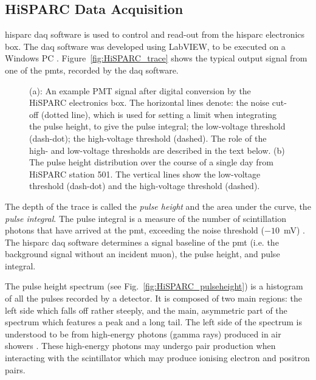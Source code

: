 \subsection{HiSPARC Data Acquisition}\label{sec:intro_HS_DAQ}

\gls{hisparc} \gls{daq} software is used to control and read-out from the \gls{hisparc} electronics box. The \gls{daq} software was developed using LabVIEW, to be executed on a Windows PC \citep{van_dam_hisparc_2020}. Figure~\ref{fig:HiSPARC_trace} shows the typical output signal from one of the \glspl{pmt}, recorded by the \gls{daq} software. 

\begin{figure}[ht!]
	\centering
	
	\caption{(a): An example PMT signal after digital conversion by the HiSPARC electronics box. The horizontal lines denote: the noise cut-off (dotted line), which is used for setting a limit when integrating the pulse height, to give the pulse integral; the low-voltage threshold (dash-dot); the high-voltage threshold (dashed). The role of the high- and low-voltage thresholds are described in the text below. (b) The pulse height distribution over the course of a single day from HiSPARC station 501. The vertical lines show the low-voltage threshold (dash-dot) and the high-voltage threshold (dashed).}
	\label{fig:pulses}
\end{figure}

The depth of the trace is called the \textit{pulse height} and the area under the curve, the \textit{pulse integral}. The pulse integral is a measure of the number of scintillation photons that have arrived at the \gls{pmt}, exceeding the noise threshold ($-10$~mV) \citep{van_dam_hisparc_2020}. The \gls{hisparc} \gls{daq} software determines a signal baseline of the \gls{pmt} (i.e. the background signal without an incident muon), the pulse height, and pulse integral.

The pulse height spectrum (see Fig.~\ref{fig:HiSPARC_pulseheight}) is a histogram of all the pulses recorded by a detector. It is composed of two main regions: the left side which falls off rather steeply, and the main, asymmetric part of the spectrum which features a peak and a long tail. The left side of the spectrum is understood to be from high-energy photons (gamma rays) produced in air showers \citep{fokkema_hisparc_2012}. These high-energy photons may undergo pair production when interacting with the scintillator which may produce ionising electron and positron pairs.

